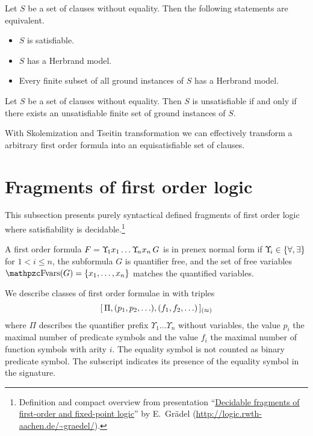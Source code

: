 \begin{theorem}[Herbrand]\label{the:herbrand}
	Let $S$ be a set of clauses without equality. Then the following statements are equivalent.
	\begin{itemize}
		\item $S$ is satisfiable.
		\item $S$ has a Herbrand model.
		\item Every finite subset of all ground instances of $S$ has a Herbrand model.
	\end{itemize} 
\end{theorem}

\begin{corollary}
	Let $S$ be a set of clauses without equality. 
	Then $S$ is unsatisfiable if and only if there exists 
	an unsatisfiable finite set of ground instances of $S$.
\end{corollary}

\begin{lemma}
With Skolemization and Tseitin transformation we can effectively transform a arbitrary first order formula into an equisatisfiable set of clauses.	
\end{lemma}



\section{Fragments of first order logic}\label{sec:decidable:fol:fragments}

This subsection presents purely syntactical defined fragments
of first order logic where satisfiability is decidable.\footnote{
	Definition and compact overview from presentation
	“\href{http://logic.rwth-aachen.de/~graedel/kalmar.pdf}{Decidable fragments of first-order and fixed-point logic}”
	by E.~Grädel (\url{http://logic.rwth-aachen.de/~graedel/}).	
}  



\begin{definition}[\PNF]
	A first order formula $F = {\Upsilon\!}_1 x_1 \ldots {\Upsilon\!}_n x_n\, G$ is in prenex normal form
	if ${\Upsilon\!}_i \in \{\forall,\exists\}$ for $1 < i \leq n$,
	the subformula $G$ is quantifier free, and 
	the set of free variables $\fvar(G) = \{ x_1, \ldots, x_n \}$
	matches the quantified variables.
\end{definition}


\begin{definition}[\cite{MR1482227}]\label{def:prefix:class}
	We describe classes of first order formulae in \PNF with triples
	\[
	[\, \Pi, (p_1,p_2,\ldots), (f_1,f_2,\ldots)\,]_{(\approx)}
	\]
	where $\Pi$ describes the quantifier prefix 
	$\Upsilon\!_1 \ldots \Upsilon\!_n$ without variables,
	the value $p_i$ the maximal number of predicate symbols
	and the value $f_i$ the maximal number of function symbols with arity $i$.
	The equality symbol is not counted as binary predicate symbol.
	The subscript indicates its presence of the equality symbol in the signature. 
	
\end{definition}

